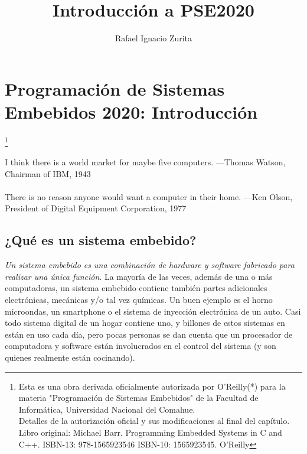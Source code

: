 \documentclass[output=paper, 
colorlinks,
citecolor=brown,
newtxmath
]{langscibook}
\author{Rafael Ignacio Zurita\affiliation{Universidad Nacional del Comahue}}
\title{Introducción a PSE2020}
\begin{document}

\chapterfont{\Large\color{LightBlue}} 
\chapter*{ Programación de Sistemas Embebidos 2020: Introducción}

\begingroup
\let\clearpage\relax
\cleardoublepage
\hypersetup{linkcolor=blue}
\tableofcontents*
\endgroup


\footnote{\scriptsize\normalfont Esta es una obra derivada oficialmente autorizada por O'Reilly(*) para la materia "Programación de Sistemas Embebidos" de la Facultad de Informática, Universidad Nacional del Comahue. \\ Detalles de la autorización oficial y sus modificaciones al final del capítulo. \\ Libro original: Michael Barr. Programming Embedded Systems in C and C++. ISBN-13: 978-1565923546
ISBN-10: 1565923545. O'Reilly }

{\def\addcontentsline#1#2#3{}\maketitle}



\hfill\begin{minipage}{0.8\linewidth} \footnotesize
I think there is a world market for maybe five computers.
—Thomas Watson, Chairman of IBM, 1943 \\
\\
There is no reason anyone would want a computer in their home.
—Ken Olson, President of Digital Equipment Corporation, 1977 \\
\end{minipage}





\section {¿Qué es un sistema embebido?}

\textit{Un sistema embebido es una combinación de hardware y software fabricado para realizar una única función}. La mayoría de las veces, además de una o más computadoras, un sistema embebido contiene también partes adicionales electrónicas, mecánicas y/o tal vez químicas. 
Un buen ejemplo es el horno microondas, un smartphone o el sistema de inyección electrónica de un auto.
Casi todo sistema digital de un hogar contiene uno, y billones de estos sistemas en están en uso 
cada día, pero pocas personas se dan cuenta que un procesador de computadora y software están
involucrados en el control del sistema (y son quienes realmente están cocinando).
\end{document}
